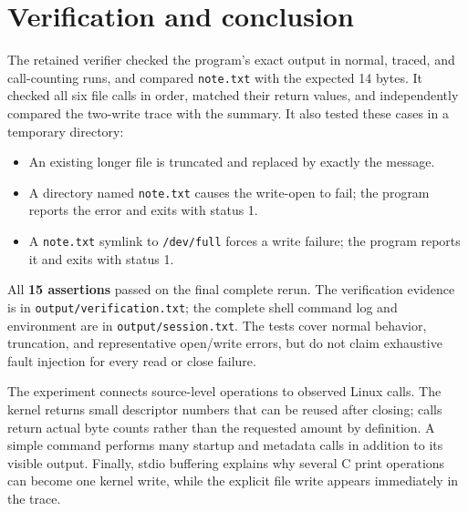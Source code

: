 \documentclass[12pt]{article}
\begin{document}
\section{Verification and conclusion}
The retained verifier checked the program's exact output in normal, traced,
and call-counting runs, and compared \texttt{note.txt} with the expected
14 bytes. It checked all six file calls in order, matched their return
values, and independently compared the two-write trace with the summary.
It also tested these cases in a temporary directory:
\begin{itemize}
\item An existing longer file is truncated and replaced by exactly the message.
\item A directory named \texttt{note.txt} causes the write-open to fail; the program reports the error and exits with status 1.
\item A \texttt{note.txt} symlink to \texttt{/dev/full} forces a write failure; the program reports it and exits with status 1.
\end{itemize}
All \textbf{15 assertions} passed on the final complete rerun.
The verification evidence is in \texttt{output/verification.txt}; the
complete shell command log and environment are in \texttt{output/session.txt}.
The tests cover normal behavior, truncation, and representative open/write
errors, but do not claim exhaustive fault injection for every read or close
failure.

The experiment connects source-level operations to observed Linux calls.
The kernel returns small descriptor numbers that can be reused after
closing; calls return actual byte counts rather than the requested amount
by definition. A simple command performs many startup and metadata calls
in addition to its visible output. Finally, stdio buffering explains why
several C print operations can become one kernel write, while the explicit
file write appears immediately in the trace.
\end{document}
